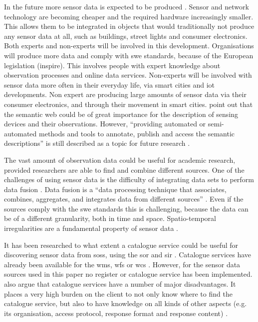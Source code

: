 In the future more sensor data is expected to be produced \citep{IoT:PWC}. Sensor and network technology are becoming cheaper and the required hardware increasingly smaller. This allows them to be integrated in objects that would traditionally not produce any sensor data at all, such as buildings, street lights and consumer electronics. Both experts and non-experts will be involved in this development. Organisations will produce more data and comply with \ac{swe} standards, because of the European legislation (\ac{inspire}). This involves people with expert knowledge about observation processes and online data services. Non-experts will be involved with sensor data more often in their everyday life, via smart cities and \ac{iot} developments. Non expert are producing large amounts of sensor data via their consumer electronics, and through their movement in smart cities. \cite{IOT:Barnaghi} point out that the semantic web could be of great importance for the description of sensing devices and their observations. However, \enquote{providing automated or semi-automated methods and tools to annotate, publish and access the semantic descriptions} is still described as a topic for future research \cite[p. 19]{IOT:Barnaghi}. 

The vast amount of observation data could be useful for academic research, provided researchers are able to find and combine different sources. One of the challenges of using sensor data is the difficulty of integrating data sets to perform data fusion \citep{SSW:Corcho, SSW:Ji, SSW:Wang}. Data fusion is a \enquote{data processing technique that associates, combines, aggregates, and integrates data from different sources} \cite[p. 2]{SSW:Wang2}. Even if the sources comply with the \ac{swe} standards this is challenging, because the data can be of a different granularity, both in time and space. Spatio-temporal irregularities are a fundamental property of sensor data \citep{SW:Ganesan}. 

It has been researched to what extent a catalogue service could be useful for discovering sensor data from \aclp{sos}, using the \ac{sor} \citep{SW:OGC4} and \ac{sir} \citep{SW:OGC3}. Catalogue services have already been available for the \ac{wms}, \ac{wfs} or \ac{wcs} \citep{SDI:OGC2}. However, for the sensor data sources used in this paper no register or catalogue service has been implemented. \cite{SSW:Atkinson} also argue that catalogue services have a number of major disadvantages. It places a very high burden on the client to not only know where to find the catalogue service, but also to have knowledge on all kinds of other aspects (e.g. its organisation, access protocol, response format and response content) \cite[p. 128]{SSW:Atkinson}. 

